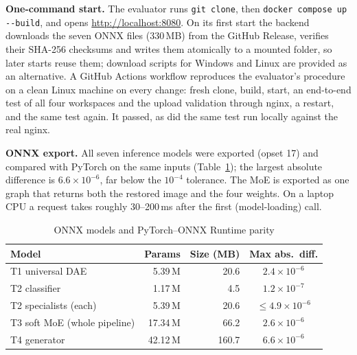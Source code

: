 \documentclass[conference]{IEEEtran}
\begin{document}
\textbf{One-command start.} The evaluator runs \texttt{git clone}, then \texttt{docker compose up -{}-build}, and opens
\url{http://localhost:8080}. On its first start the backend downloads the seven ONNX files (330\,MB) from the GitHub
Release, verifies their SHA-256 checksums and writes them atomically to a mounted folder, so later starts reuse them;
download scripts for Windows and Linux are provided as an alternative. A GitHub Actions workflow reproduces the
evaluator's procedure on a clean Linux machine on every change: fresh clone, build, start, an end-to-end test of all
four workspaces and the upload validation through nginx, a restart, and the same test again. It passed, as did the
same test run locally against the real nginx.

\textbf{ONNX export.} All seven inference models were exported (opset 17) and compared with PyTorch on the same
inputs (Table~\ref{tab:onnx}); the largest absolute difference is $6.6\times10^{-6}$, far below the $10^{-4}$
tolerance. The MoE is exported as one graph that returns both the restored image and the four weights. On a laptop
CPU a request takes roughly 30--200\,ms after the first (model-loading) call.

\begin{table}[!htbp]
\centering\caption{ONNX models and PyTorch--ONNX Runtime parity}\label{tab:onnx}
\scriptsize\setlength{\tabcolsep}{4pt}
\begin{tabular}{@{}lrrc@{}}
\toprule
Model & Params & Size (MB) & Max abs.\ diff.\\
\midrule
T1 universal DAE & 5.39\,M & 20.6 & $2.4\times10^{-6}$\\
T2 classifier & 1.17\,M & 4.5 & $1.2\times10^{-7}$\\
T2 specialists (each) & 5.39\,M & 20.6 & $\le4.9\times10^{-6}$\\
T3 soft MoE (whole pipeline) & 17.34\,M & 66.2 & $2.6\times10^{-6}$\\
T4 generator & 42.12\,M & 160.7 & $6.6\times10^{-6}$\\
\bottomrule
\end{tabular}
\end{table}

\clearpage
\end{document}
